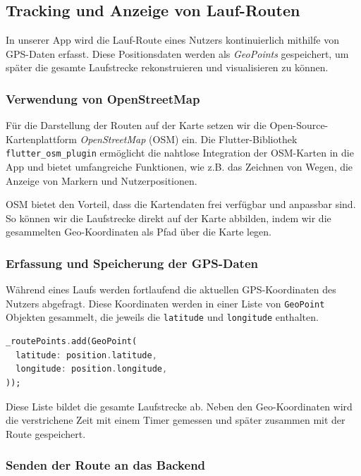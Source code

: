 \documentclass[11pt,a4paper]{article}
\begin{document}
\subsection{Tracking und Anzeige von Lauf-Routen}

In unserer App wird die Lauf-Route eines Nutzers kontinuierlich mithilfe von GPS-Daten erfasst. Diese Positionsdaten werden als \textit{GeoPoints} gespeichert, um später die gesamte Laufstrecke rekonstruieren und visualisieren zu können.

\subsubsection{Verwendung von OpenStreetMap}

Für die Darstellung der Routen auf der Karte setzen wir die Open-Source-Kartenplattform \textit{OpenStreetMap} (OSM)\cite{openstreetmap} ein. Die Flutter-Bibliothek \texttt{flutter\_osm\_plugin}\cite{flutter_osm_plugin} ermöglicht die nahtlose Integration der OSM-Karten in die App und bietet umfangreiche Funktionen, wie z.B. das Zeichnen von Wegen, die Anzeige von Markern und Nutzerpositionen.

OSM bietet den Vorteil, dass die Kartendaten frei verfügbar und anpassbar sind. So können wir die Laufstrecke direkt auf der Karte abbilden, indem wir die gesammelten Geo-Koordinaten als Pfad über die Karte legen.

\subsubsection{Erfassung und Speicherung der GPS-Daten}

Während eines Laufs werden fortlaufend die aktuellen GPS-Koordinaten des Nutzers abgefragt. Diese Koordinaten werden in einer Liste von \texttt{GeoPoint} Objekten gesammelt, die jeweils die \texttt{latitude} und \texttt{longitude} enthalten.

\begin{lstlisting}[language=Dart, caption=Hinzufügen eines GeoPoints zur Route]
_routePoints.add(GeoPoint(
  latitude: position.latitude,
  longitude: position.longitude,
));
\end{lstlisting}

Diese Liste bildet die gesamte Laufstrecke ab. Neben den Geo-Koordinaten wird die verstrichene Zeit mit einem Timer gemessen und später zusammen mit der Route gespeichert.

\subsubsection{Senden der Route an das Backend}
\end{document}
